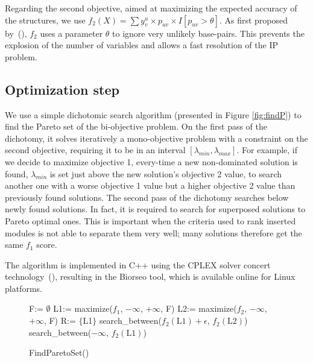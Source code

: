 \documentclass{bioinfo}
\begin{document}
\begin{methods}
Regarding the second objective, aimed at maximizing the expected accuracy of the structures, we use $f_2(X) = \sum y^u_v \times p_{uv} \times I[p_{uv}>\theta]$. As first proposed by~(\citealp{sato_ipknot:_2011}), $f_2$ uses a parameter $\theta$ to ignore very unlikely base-pairs. This prevents the explosion of the number of variables and allows a fast resolution of the IP problem.


\subsection{Optimization step}
We use a simple dichotomic search algorithm (presented in Figure \ref{fig:findP}) to find the Pareto set of the bi-objective problem. On the first pass of the dichotomy, it solves iteratively a mono-objective problem with a constraint on the second objective, requiring it to be in an interval $[\lambda_{min}, \lambda_{max}]$. For example, if we decide to maximize objective 1, every-time a new non-dominated solution is found, $\lambda_{min}$ is set just above the new solution's objective 2 value, to search another one with a worse objective 1 value but a higher objective 2 value than previously found solutions. The second pass of the dichotomy searches below newly found solutions. In fact, it is required to search for superposed solutions to Pareto optimal ones. This is important when the criteria used to rank inserted modules is not able to separate them very well; many solutions therefore get the same $f_1$ score.

The algorithm is implemented  in C++ using the CPLEX solver concert technology~(\citealp{cplex}), resulting in the Biorseo tool, which is available online for Linux platforms.
\begin{figure}[!tbp]
\begin{algorithm}[H]
F:= $\emptyset$\;
L1:= maximize($f_1$, $-\infty$, $+\infty$, F)\;
L2:= maximize($f_2$, $-\infty$, $+\infty$, F)\;
R:= $\{$L1$\}$\;
search\_between($f_2(\text{L1}) + \epsilon$, $f_2(\text{L2})$)\;
search\_between($-\infty$, $f_2(\text{L1})$)\;
\;
\caption{FindParetoSet()}
\end{algorithm}


\end{figure}
\end{methods}
\end{document}

